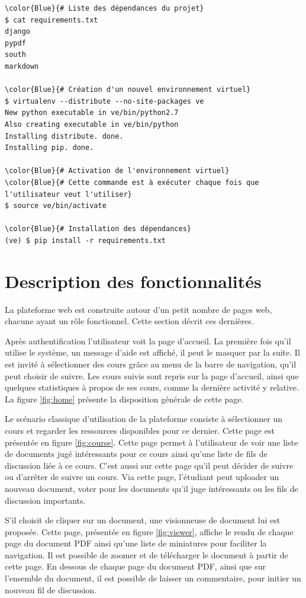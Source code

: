 \documentclass[a4paper,12pt]{article}
\begin{document}
\begin{Verbatim}
\color{Blue}{# Liste des dépendances du projet}
$ cat requirements.txt
django
pypdf
south
markdown

\color{Blue}{# Création d'un nouvel environnement virtuel}
$ virtualenv --distribute --no-site-packages ve
New python executable in ve/bin/python2.7
Also creating executable in ve/bin/python
Installing distribute. done.
Installing pip. done.

\color{Blue}{# Activation de l'environnement virtuel}
\color{Blue}{# Cette commande est à exécuter chaque fois que l'utilisateur veut l'utiliser}
$ source ve/bin/activate

\color{Blue}{# Installation des dépendances}
(ve) $ pip install -r requirements.txt
\end{Verbatim}


\section{Description des fonctionnalités}

La plateforme web est construite autour d'un petit nombre de pages web, chacune
ayant un rôle fonctionnel. Cette section décrit ces dernières.

Après authentification l'utilisateur voit la page d'accueil. La première fois qu'il
utilise le système, un message d'aide est affiché, il peut le masquer par la suite.
Il est invité à sélectionner des cours grâce au menu de la barre de navigation,
qu'il peut choisir de suivre. Les cours suivis sont repris sur la page d'accueil, ainsi
que quelques statistiques à propos de ses cours, comme la dernière activité y relative.
La figure \ref{fig:home} présente la disposition générale de cette page.

Le scénario classique d'utilisation de la plateforme consiste à sélectionner un cours
et regarder les ressources disponibles pour ce dernier. Cette page est présentée en
figure \ref{fig:course}. Cette page permet à l'utilisateur de voir une liste de documents
jugé intéressants pour ce cours ainsi qu'une liste de fils de discussion liée à ce cours.
C'est aussi sur cette page qu'il peut décider de suivre ou d'arrêter de suivre un cours.
Via cette page, l'étudiant peut uploader un nouveau document, voter pour les documents
qu'il juge intéressants ou les fils de discussion importants.

S'il choisit de cliquer sur un document, une visionneuse de document lui est proposée.
Cette page, présentée en figure \ref{fig:viewer}, affiche le rendu de chaque page
du document PDF ainsi qu'une liste de miniatures pour faciliter la navigation. Il
est possible de zoomer et de télécharger le document à partir de cette page. En
dessous de chaque page du document PDF, ainsi que sur l'ensemble du document, il
est possible de laisser un commentaire, pour initier un nouveau fil de discussion.
\end{document}
